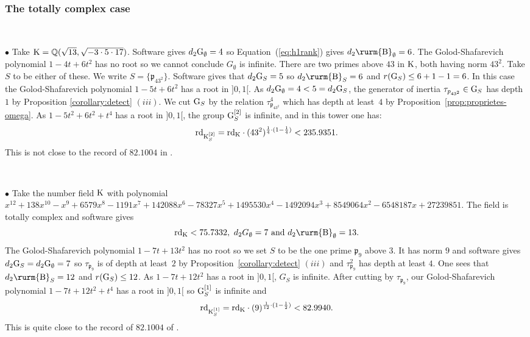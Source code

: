 \documentclass[12pt,a4paper,twoside,english]{smfart}
\def\Q{{\mathbb Q}}
\def\p{{\mathfrak p}}
\def\CyB{{{\textnormal{\rurm{B}}}}}
\def\G{{\rm G}}
\def\K{{\rm K}}
\def\rd{{\rm rd}}
\begin{document}
  \subsubsection{The totally complex case}
  
  \
  
  
  
  $\bullet$ Take $\K=\Q(\sqrt{13},\sqrt{-3 \cdot 5 \cdot 17})$. Software gives
  $d_2 \G_\emptyset=4$ so Equation~(\ref{eq:h1rank}) gives $d_2  \CyB_\emptyset =6$. The Golod-Shafarevich polynomial
  $1-4t+6t^2$ has no root so we cannot conclude $G_\emptyset$ is infinite. 
  There are two primes above $43$ in $\K$, both having norm $43^2$.
 Take $S$ to be either of these. We write $S=\{\p_{43^2}\}$.
 Software gives that $d_2 \G_S=5$ so $d_2 \CyB_S =6$ and $r(\G_S)  \leq 6+1-1=6$. In this case the 
   Golod-Shafarevich polynomial
  $1-5t+6t^2$ has a root in $]0,1[$.
  As $d_2 \G_\emptyset=4 < 5 = d_2 \G_S$,
the generator of inertia $\tau_{\p_{43^2} }\in \G_S$ has depth~$1$ by  Proposition \ref{corollary:detect} $(iii)$.  We cut $\G_S$ by the relation $\tau_{\p_{43^2}}^4$ which has
depth at least~$4$ by Proposition~\ref{prop:proprietes-omega}.  As $1-5t^2+6t^2+t^4$ has a root in $]0,1[$, the group   $\G_S^{[2]}$ is infinite, and in this tower one has: 
$$\rd_{\K_S^{[2]}} = \rd_\K \cdot (43^2)^{\frac14 \cdot (1-\frac14)}   < 235.9351.$$
  This is not close to the record of $82.1004$ in  \cite{Hajir-Maire-JSC} .

\

  
  $\bullet$
  Take the number field $\K$
  with polynomial $x^{12} + 138x^{10} - x^9 + 6579x^8 - 1191x^7 + 142088x^6 - 78327x^5 + 1495530x^4 - 1492094x^3 + 8549064x^2 - 6548187x + 27239851$.
  The field is totally complex and software gives
  $$\rd_\K < 75.7332,\,\,d_2 G_\emptyset=7\mbox{ and }d_2  \CyB_\emptyset =13.$$ 
  The Golod-Shafarevich polynomial
  $1-7t+13t^2$ has no root so we set $S$ to be the one
  prime $\p_{9}$ above $3$. It has norm $9$ and software gives $d_2 \G_{S}=d_2 \G_\emptyset=7$ so $\tau_{\p_{9}}$ 
  is of  depth at least~$2$ by  Proposition~\ref{corollary:detect} $(iii)$  and
 $\tau^2_{\p_{9}}$ has depth at least $4$.
  One sees that $d_2 \CyB_S=12$ and $r(\G_S) \leq 12$. As $1-7t+12t^2$ has a root in  $]0,1[$, $G_S$ is infinite. 
After cutting by $\tau_{\p_{9}}$, our Golod-Shafarevich polynomial
  $1-7t+12t^2+t^4$ has a root in  $]0,1[$ so $\G_S^{[1]}$  is infinite and
  $$\rd_{\K_S^{[1]}} = \rd_\K \cdot (9)^{\frac1{12} \cdot (1-\frac12)}   < 82.9940.$$
 This is quite close to the record of $82.1004$ of \cite{Hajir-Maire-JSC}.
\end{document}
